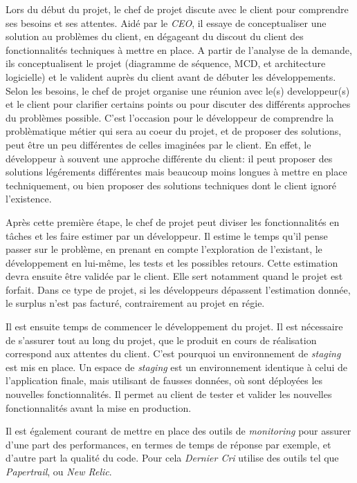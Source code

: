 \bigskip

Lors du début du projet, le chef de projet discute avec le client pour
comprendre ses besoins et ses attentes. Aidé par le \emph{CEO}, il
essaye de conceptualiser une solution au problèmes du client, en
dégageant du discout du client des fonctionnalités techniques à mettre
en place. A partir de l'analyse de la demande, ils conceptualisent le
projet (diagramme de séquence, MCD, et architecture logicielle) et le
valident auprès du client avant de débuter les développements. Selon les
besoins, le chef de projet organise une réunion avec le(s)
developpeur(s) et le client pour clarifier certains points ou pour
discuter des différents approches du problèmes possible. C'est
l'occasion pour le développeur de comprendre la problèmatique métier qui
sera au coeur du projet, et de proposer des solutions, peut être un peu
différentes de celles imaginées par le client. En effet, le développeur
à souvent une approche différente du client: il peut proposer des
solutions légérements différentes mais beaucoup moins longues à mettre
en place techniquement, ou bien proposer des solutions techniques dont
le client ignoré l'existence.

\bigskip

Après cette première étape, le chef de projet peut diviser les
fonctionnalités en tâches et les faire estimer par un développeur. Il
estime le temps qu'il pense passer sur le problème, en prenant en compte
l'exploration de l'existant, le développement en lui-même, les tests et
les possibles retours. Cette estimation devra ensuite être validée par
le client. Elle sert notamment quand le projet est forfait. Dans ce type
de projet, si les développeurs dépassent l'estimation donnée, le surplus
n'est pas facturé, contrairement au projet en régie.

\bigskip

Il est ensuite temps de commencer le développement du projet. Il est
nécessaire de s'assurer tout au long du projet, que le produit en cours
de réalisation correspond aux attentes du client. C'est pourquoi un
environnement de \emph{staging} est mis en place. Un espace de
\emph{staging} est un environnement identique à celui de l'application
finale, mais utilisant de fausses données, où sont déployées les
nouvelles fonctionnalités. Il permet au client de tester et valider les
nouvelles fonctionnalités avant la mise en production.

\bigskip

Il est également courant de mettre en place des outils de
\emph{monitoring} pour assurer d'une part des performances, en termes de
temps de réponse par exemple, et d'autre part la qualité du code. Pour
cela \emph{Dernier Cri} utilise des outils tel que \emph{Papertrail}, ou
\emph{New Relic}.

